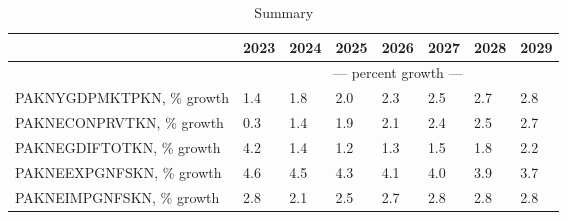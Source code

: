 \documentclass{article}
\begin{document}
\begin{table}
\caption{Summary}
\begin{tabular}{llllllll}
\toprule
 & 2023 & 2024 & 2025 & 2026 & 2027 & 2028 & 2029 \\
\midrule
&\multicolumn{7}{c}{--- percent growth ---}                                                                                                                                             \\
PAKNYGDPMKTPKN, \% growth &                  1.4 &                  1.8 &                  2.0 &                  2.3 &                  2.5 &                  2.7 &                  2.8 \\
PAKNECONPRVTKN, \% growth &                  0.3 &                  1.4 &                  1.9 &                  2.1 &                  2.4 &                  2.5 &                  2.7 \\
PAKNEGDIFTOTKN, \% growth &                  4.2 &                  1.4 &                  1.2 &                  1.3 &                  1.5 &                  1.8 &                  2.2 \\
PAKNEEXPGNFSKN, \% growth &                  4.6 &                  4.5 &                  4.3 &                  4.1 &                  4.0 &                  3.9 &                  3.7 \\
PAKNEIMPGNFSKN, \% growth &                  2.8 &                  2.1 &                  2.5 &                  2.7 &                  2.8 &                  2.8 &                  2.8 \\
\bottomrule
\end{tabular}
\end{table}
\end{document}
